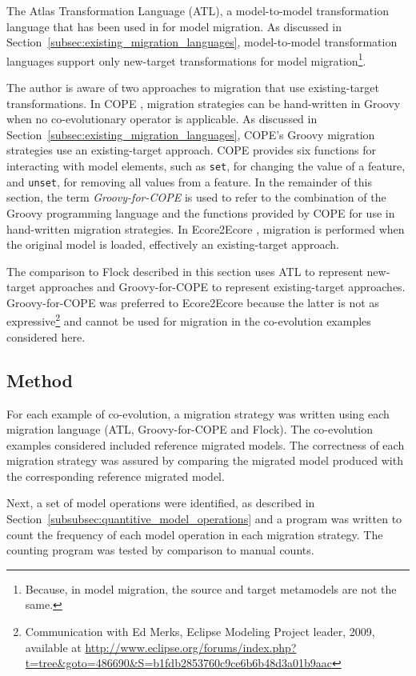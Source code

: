 The Atlas Transformation Language (ATL), a model-to-model transformation language that has been used in \cite{cicchetti08automating,garces09managing} for model migration. As discussed in Section~\ref{subsec:existing_migration_languages}, model-to-model transformation languages support only new-target transformations for model migration\footnote{Because, in model migration, the source and target metamodels are not the same.}.

The author is aware of two approaches to migration that use existing-target transformations. In COPE \cite{herrmannsdoerfer09cope}, migration strategies can be hand-written in Groovy when no co-evolutionary operator is applicable. As discussed in Section~\ref{subsec:existing_migration_languages}, COPE's Groovy migration strategies use an existing-target approach. COPE provides six functions for interacting with model elements, such as \texttt{set}, for changing the value of a feature, and \texttt{unset}, for removing all values from a feature. In the remainder of this section, the term \emph{Groovy-for-COPE} is used to refer to the combination of the Groovy programming language and the functions provided by COPE for use in hand-written migration strategies. In Ecore2Ecore \cite{hussey06advanced}, migration is performed when the original model is loaded, effectively an existing-target approach.

The comparison to Flock described in this section uses ATL to represent new-target approaches and Groovy-for-COPE to represent existing-target approaches. Groovy-for-COPE was preferred to Ecore2Ecore because the latter is not as expressive\footnote{Communication with Ed Merks, Eclipse Modeling Project leader, 2009, available at \url{http://www.eclipse.org/forums/index.php?t=tree&goto=486690&S=b1fdb2853760c9ce6b6b48d3a01b9aac}} and cannot be used for migration in the co-evolution examples considered here.

\subsection{Method}
\label{subsubsec:quantitive_method}
For each example of co-evolution, a migration strategy was written using each migration language (ATL, Groovy-for-COPE and Flock). The co-evolution examples considered included reference migrated models. The correctness of each migration strategy was assured by comparing the migrated model produced with the corresponding reference migrated model.

Next, a set of model operations were identified, as described in Section~\ref{subsubsec:quantitive_model_operations} and a program was written to count the frequency of each model operation in each migration strategy. The counting program was tested by comparison to manual counts.

